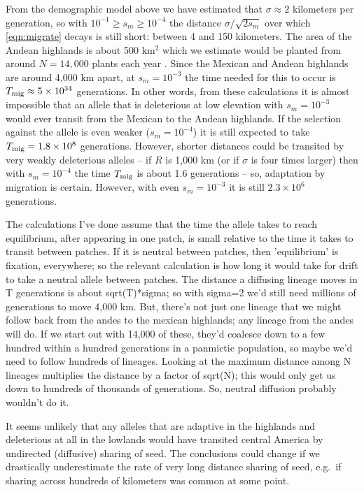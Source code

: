 {{From the demographic model above
we have estimated that $\sigma \approx 2$ kilometers per generation,
so with $10^{-1} \ge s_m \ge 10^{-4}$ the distance $\sigma/\sqrt{2s_m}$ over which \eqref{eqn:migrate} decays 
is still short: between 4 and 150 kilometers.
The area of the Andean highlands is about 500 km$^2$ 
which we estimate would be planted from around $N=14,000$ plants each year .
Since the Mexican and Andean highlands are around 4,000 km apart,
at $s_m=10^{-3}$ the time needed for this to occur is $T_{\text{mig}} \approx 5 \times 10^{34}$ generations.
In other words, from these calculations it is almost impossible that an allele that is deleterious at low elevation with $s_m=10^{-3}$ 
would ever transit from the Mexican to the Andean highlands.
If the selection against the allele is even weaker ($s_m=10^{-4}$) it is still expected to take $T_{\text{mig}} = 1.8 \times 10^8$ generations.
However, shorter distances could be transited by very weakly deleterious alleles --
if $R$ is 1,000 km (or if $\sigma$ is four times larger)
then with $s_m=10^{-4}$ the time $T_{\text{mig}}$ is about 1.6 generations --
so, adaptation by migration is certain.
However, with even $s_m=10^{-3}$ it is still $2.3 \times 10^6$ generations.

The calculations I've done assume that the time the allele takes to reach equilibrium, after appearing in one patch, is small relative to the time it takes to transit between patches.  If it is neutral between patches, then 'equilibrium' is fixation, everywhere; so the relevant calculation is how long it would take for drift to take a neutral allele between patches.  The distance a diffusing lineage moves in T generations is about sqrt(T)*sigma; so with sigma=2 we'd still need millions of generations to move 4,000 km.  But, there's not just one lineage that we might follow back from the andes to the mexican highlands; any lineage from the andes will do.  If we start out with 14,000 of these, they'd coalesce down to a few hundred within a hundred generations in a panmictic population, so maybe we'd need to follow hundreds of lineages.  Looking at the maximum distance among N lineages multiplies the distance by a factor of sqrt(N); this would only get us down to hundreds of thousands of generations.  So, neutral diffusion probably wouldn't do it.

It seems unlikely that any alleles that are adaptive in the highlands and deleterious at all in the lowlands
would have transited central America by undirected (diffusive) sharing of seed.
The conclusions could change if we drastically underestimate the rate of very long distance sharing of seed,
e.g.\ if sharing across hundreds of kilometers was common at some point.

}}
